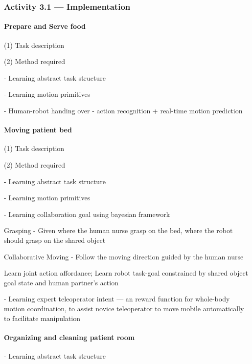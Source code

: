 \documentclass[letterpaper, 11 pt, onecolumn]{article}
\begin{document}
\subsubsection{Activity 3.1 --- Implementation}\label{sec:plan-evaluation-implementation}
\noindent


\paragraph*{Prepare and Serve food}

(1) Task description

(2) Method required 

- Learning abstract task structure

- Learning motion primitives

- Human-robot handing over - action recognition + real-time motion prediction 

\paragraph*{Moving patient bed}
 
(1) Task description  

(2) Method required  

- Learning abstract task structure

- Learning motion primitives

- Learning collaboration goal using bayesian framework

Grasping - Given where the human nurse grasp on the bed, where the robot should grasp on the shared object

Collaborative Moving - Follow the moving direction guided by the human nurse

Learn joint action affordance; Learn robot task-goal constrained by shared object goal state and human partner's action

- Learning expert teleoperator intent --- an reward function for whole-body motion coordination, to assist novice teleoperator to  move mobile automatically to facilitate manipulation 


\paragraph*{Organizing and cleaning patient room}

- Learning abstract task structure
\end{document}
